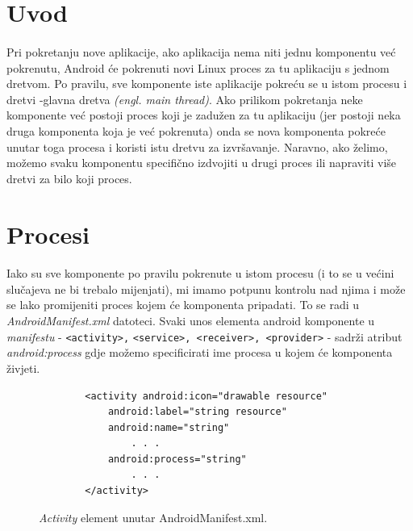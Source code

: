 \documentclass[times, utf8, zavrsni]{fer}
\begin{document}
\section{Uvod}
\paragraph{}
Pri pokretanju nove aplikacije, ako aplikacija nema niti jednu komponentu već pokrenutu, Android će pokrenuti novi Linux proces za tu aplikaciju s jednom dretvom. Po pravilu, sve komponente iste aplikacije pokreću se u istom procesu i dretvi -glavna dretva \textit{(engl. main thread)}. Ako prilikom pokretanja neke komponente već postoji proces koji je zadužen za tu aplikaciju (jer postoji neka druga komponenta koja je već pokrenuta) onda se nova komponenta pokreće unutar toga procesa i koristi istu dretvu za izvršavanje. Naravno, ako želimo, možemo svaku komponentu specifično izdvojiti u drugi proces ili napraviti više dretvi za bilo koji proces.

\section{Procesi}
\paragraph{}
Iako su sve komponente po pravilu pokrenute u istom procesu (i to se u većini slučajeva ne bi trebalo mijenjati), mi imamo potpunu kontrolu nad njima i može se lako promijeniti proces kojem će komponenta pripadati. To se radi u \textit{AndroidManifest.xml} datoteci. Svaki unos elementa android komponente u \textit{manifestu} - \verb|<activity>,| \verb|<service>, <receiver>, <provider>| - sadrži atribut \textit{android:process} gdje možemo specificirati ime procesa u kojem će komponenta živjeti.

\begin{figure}[ht!]
\centering
\begingroup
    \fontsize{10pt}{12pt}\selectfont
		\begin{lstlisting}
        <activity android:icon="drawable resource"
            android:label="string resource"
            android:name="string"
          	    . . .
            android:process="string"
          	    . . .
        </activity>
		\end{lstlisting}
\endgroup
\caption{\textit{Activity} element unutar AndroidManifest.xml.}
\label{overflow}
\end{figure}
\end{document}
